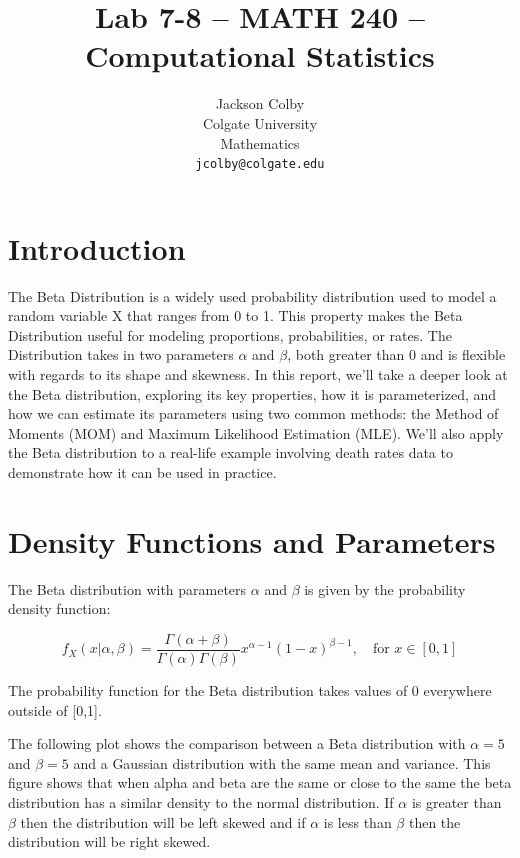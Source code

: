 \documentclass{article}\usepackage[]{graphicx}\usepackage[]{xcolor}
\begin{document}
\title{Lab 7-8 -- MATH 240 -- Computational Statistics}

\author{
  Jackson Colby \\
  Colgate University  \\
  Mathematics  \\
  {\tt jcolby@colgate.edu}
}

\date{}

\maketitle

\begin{multicols}{2}

\section{Introduction}

The Beta Distribution is a widely used probability distribution used to model a random variable X that ranges from 0 to 1. This property makes the Beta Distribution useful for modeling proportions, probabilities, or rates. The Distribution takes in two parameters \( \alpha \) and \( \beta \), both greater than 0 and is flexible with regards to its shape and skewness. In this report, we’ll take a deeper look at the Beta distribution, exploring its key properties, how it is parameterized, and how we can estimate its parameters using two common methods: the Method of Moments (MOM) and Maximum Likelihood Estimation (MLE). We’ll also apply the Beta distribution to a real-life example involving death rates data to demonstrate how it can be used in practice.


\section{Density Functions and Parameters}

The Beta distribution with parameters \( \alpha \) and \( \beta \) is given by the probability density function:

\[
f_X(x | \alpha, \beta) = \frac{\Gamma(\alpha + \beta)}{\Gamma(\alpha) \Gamma(\beta)} x^{\alpha - 1} (1 - x)^{\beta - 1}, \quad \text{for } x \in [0, 1]
\]

The probability function for the Beta distribution takes values of 0 everywhere outside of [0,1]. 


The following plot shows the comparison between a Beta distribution with \(\alpha=5\) and \(\beta=5\) and a Gaussian distribution with the same mean and variance. This figure shows that when alpha and beta are the same or close to the same the beta distribution has a similar density to the normal distribution. If \(\alpha\) is greater than \(\beta\) then the distribution will be left skewed and if \(\alpha\) is less than \(\beta\) then the distribution will be right skewed. 


\end{multicols}
\end{document}
